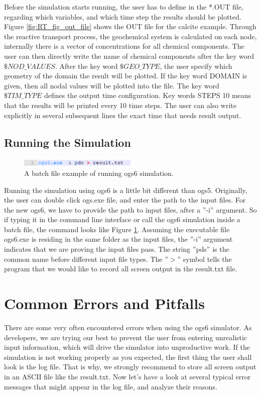 Before the simulation starts running, the user has to define in the *.OUT file, regarding which variables, and which time step the results should be plotted. Figure \ref{fig:RT_fig_out_file} shows the OUT file for the calcite example. Through the reactive transport process, the geochemical system is calculated on each node, internally there is a vector of concentrations for all chemical components. The user can then directly write the name of chemical components after the key word $\$NOD\_VALUES$. After the key word $\$GEO\_TYPE$, the user specify which geometry of the domain the result will be plotted. If the key word DOMAIN is given, then all nodal values will be plotted into the file. The key word $\$TIM\_TYPE$ defines the output time configuration. Key words STEPS 10 means that the results will be printed every 10 time steps. The user can also write explicitly in several subsequent lines the exact time that needs result output.   

\subsection{Running the Simulation}

\begin{figure}
\includegraphics[width=0.5\textwidth]{RT/figs/RT_fig_bat_file}
\caption{A batch file example of running ogs6 simulation. }
\label{fig:RT_fig_bat_file}
\end{figure}

Running the simulation using ogs6 is a little bit different than ogs5. Originally, the user can double click ogs.exe file, and enter the path to the input files. For the new ogs6, we have to provide the path to input files, after a ''-i'' argument. So if typing it in the command line interface or call the ogs6 simulation inside a batch file, the command looks like Figure \ref{fig:RT_fig_bat_file}. Assuming the executable file ogs6.exe is residing in the same folder as the input files, the ''-i'' argument indicates that we are proving the input files pass. The string ''pds'' is the common name before different input file types. The ''$>$'' symbol tells the program that we would like to record all screen output in the result.txt file. 

\section{Common Errors and Pitfalls}
\label{sec:common_error}
There are some very often encountered errors when using the ogs6 simulator. As developers, we are trying our best to prevent the user from entering unrealistic input information, which will drive the simulator into unproductive work. If the simulation is not working properly as you expected, the first thing the user shall look is the log file. That is why, we strongly recommend to store all screen output in an ASCII file like the result.txt. Now let’s have a look at several typical error messages that might appear in the log file, and analyze their reasons. 

